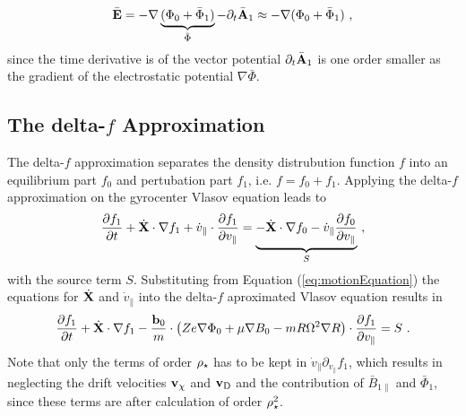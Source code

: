 \begin{gather}
	\bar{\boldsymbol{\mathbf{E}}} = - \nabla\underbrace{(\Phi_0 + \bar{\Phi}_1)}_{\bar{\Phi}} - \partial_t \bar{\boldsymbol{\mathbf{A}}}_1 \approx - \nabla(\Phi_0 + \bar{\Phi}_1) ~,
	\label{eq:totalElectricField}
\end{gather}
since the time derivative is of the vector potential $\partial_t \bar{\boldsymbol{\mathbf{A}}}_1$ is one order smaller as the gradient of the electrostatic potential $\nabla \bar{\Phi}$.

\newpage

\subsection{The delta-$f$ Approximation}
\label{sub:approximation}

The delta-$f$ approximation separates the density distrubution function $f$ into an equilibrium part $f_0$ and pertubation part $f_1$, i.e. $f = f_0 + f_1$. Applying the delta-$f$ approximation on the gyrocenter Vlasov equation leads to
\begin{gather}
	\frac{\partial f_1}{\partial t} + \dot{\boldsymbol{\mathbf{X}}} \cdot \nabla f_1 + \dot{v}_\parallel \cdot \frac{\partial f_1}{\partial v_\parallel} = \underbrace{- \dot{\boldsymbol{\mathbf{X}}} \cdot \nabla f_0 - \dot{v}_\parallel \frac{\partial f_0}{\partial v_\parallel}}_S~,
	\label{eq:gyrocenterDeltafVlasov}
\end{gather}
with the source term $S$. Substituting from Equation (\ref{eq:motionEquation}) the equations for $\dot{\boldsymbol{\mathbf{X}}}$ and $\dot{v}_\parallel$ into the delta-$f$ aproximated Vlasov equation results in
\begin{gather}
	\frac{\partial f_1}{\partial t} + \dot{\boldsymbol{\mathbf{X}}} \cdot \nabla f_1 - \frac{\boldsymbol{\mathbf{b}}_0}{m} \cdot \left(Ze\nabla \Phi_0 + \mu \nabla B_0 - mR \Omega^2 \nabla R \right) \cdot \frac{\partial f_1}{\partial v_\parallel} = S~.
	\label{eq:gyrocenterDeltafSubVlasov}
\end{gather}
Note that only the terms of order $\rho_\star$ has to be kept in $\dot{v}_\parallel \partial_{v_\parallel} f_1$, which results in neglecting the drift velocities $\boldsymbol{\mathbf{v}}_\chi$ and $\boldsymbol{\mathbf{v}}_\mathrm{D}$ and the contribution of $\bar{B}_{1\parallel}$ and $\bar{\Phi}_1$, since these terms are after calculation of order $\rho_\star^2$. \bigskip

